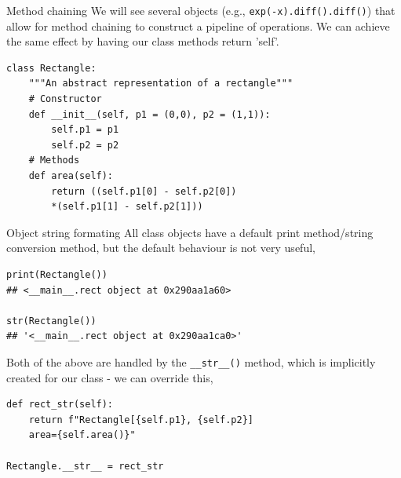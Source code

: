 \documentclass[10pt]{beamer}
\begin{document}
\begin{frame}[fragile]{Method chaining}
We will see several objects (e.g., \texttt{exp(-x).diff().diff()}) that allow for method chaining to construct a pipeline of operations. We can achieve the same effect by having our class methods return 'self'.\\
\vspace{1cm}

\begin{lstlisting}[style=mypython]
class Rectangle:
	"""An abstract representation of a rectangle"""
	# Constructor
	def __init__(self, p1 = (0,0), p2 = (1,1)):
		self.p1 = p1
		self.p2 = p2
	# Methods
	def area(self):
		return ((self.p1[0] - self.p2[0])
		*(self.p1[1] - self.p2[1]))
\end{lstlisting}

\end{frame}

\begin{frame}[fragile]{Object string formating}
All class objects have a default print method/string conversion method, but the default behaviour is not very useful,
\begin{lstlisting}[style=mypython]
print(Rectangle())
## <__main__.rect object at 0x290aa1a60>

str(Rectangle())
## '<__main__.rect object at 0x290aa1ca0>'
\end{lstlisting}
Both of the above are handled by the \texttt{\_\_str\_\_()} method, which is implicitly created for our class - we can override this,
\begin{lstlisting}[style=mypython]
def rect_str(self):
	return f"Rectangle[{self.p1}, {self.p2}]
	area={self.area()}"

Rectangle.__str__ = rect_str
\end{lstlisting}
\end{frame}
\end{document}
